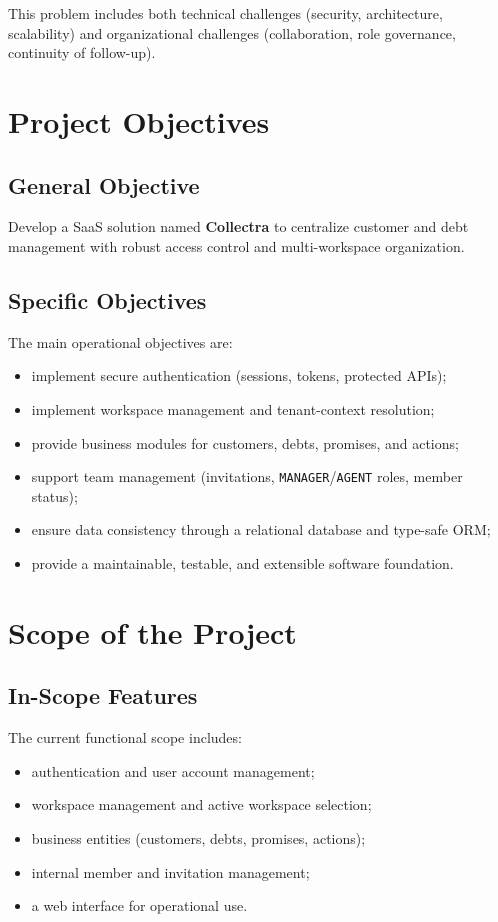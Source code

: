 \documentclass[12pt,a4paper]{report}
\begin{document}
This problem includes both technical challenges (security, architecture, scalability) and organizational challenges (collaboration, role governance, continuity of follow-up).

\section{Project Objectives}
\subsection{General Objective}
Develop a SaaS solution named \textbf{Collectra} to centralize customer and debt management with robust access control and multi-workspace organization.

\subsection{Specific Objectives}
The main operational objectives are:
\begin{itemize}
  \item implement secure authentication (sessions, tokens, protected APIs);
  \item implement workspace management and tenant-context resolution;
  \item provide business modules for customers, debts, promises, and actions;
  \item support team management (invitations, \texttt{MANAGER}/\texttt{AGENT} roles, member status);
  \item ensure data consistency through a relational database and type-safe ORM;
  \item provide a maintainable, testable, and extensible software foundation.
\end{itemize}

\section{Scope of the Project}
\subsection{In-Scope Features}
The current functional scope includes:
\begin{itemize}
  \item authentication and user account management;
  \item workspace management and active workspace selection;
  \item business entities (customers, debts, promises, actions);
  \item internal member and invitation management;
  \item a web interface for operational use.
\end{itemize}
\end{document}
